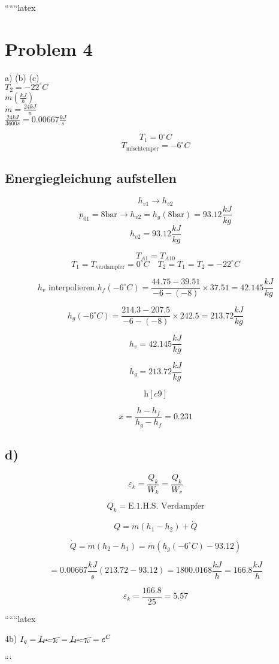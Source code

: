 
``````latex


\section*{Problem 4}

a) (b) (c) \\
$T_2 = -22^\circ C$ \\
$\dot{m} \left( \frac{kJ}{h} \right)$ \\
$\dot{m} = \frac{24 kJ}{n}$ \\
$\frac{24 kJ}{3600 s} = 0.00667 \frac{kJ}{s}$

\[
T_1 = 0^\circ C
\]
\[
T_{\text{mischtemper}} = -6^\circ C
\]

\subsection*{Energiegleichung aufstellen}

\[
h_{v1} \rightarrow h_{v2}
\]
\[
p_{01} = 8 \text{bar} \rightarrow h_{v2} = h_{g} (8 \text{bar}) = 93.12 \frac{kJ}{kg}
\]
\[
h_{v2} = 93.12 \frac{kJ}{kg}
\]

\[
T_{A1} = T_{A10}
\]
\[
T_{1} = T_{\text{verdampfer}} = 0^\circ C \quad T_{2} = T_{1} = T_{2} = -22^\circ C
\]

\[
h_{v} \text{ interpolieren } h_{f} (-6^\circ C) = \frac{44.75 - 39.51}{-6 - (-8)} \times 37.51 = 42.145 \frac{kJ}{kg}
\]

\[
h_{g} (-6^\circ C) = \frac{214.3 - 207.5}{-6 - (-8)} \times 242.5 = 213.72 \frac{kJ}{kg}
\]

\[
h_{v} = 42.145 \frac{kJ}{kg}
\]

\[
h_{g} = 213.72 \frac{kJ}{kg}
\]

\[
\text{h} \left[ c9 \right]
\]

\[
x = \frac{h - h_f}{h_g - h_f} = 0.231
\]

\subsection*{d)}

\[
\varepsilon_k = \frac{Q_k}{W_k} = \frac{Q_k}{W_v}
\]

\[
Q_k = \text{E.1.H.S. Verdampfer}
\]

\[
Q = \dot{m} (h_1 - h_2) + \dot{Q}
\]

\[
\dot{Q} = \dot{m} (h_2 - h_1) = \dot{m} (h_g (-6^\circ C) - 93.12)
\]

\[
= 0.00667 \frac{kJ}{s} (213.72 - 93.12) = 1800.0168 \frac{kJ}{h} = 166.8 \frac{kJ}{h}
\]

\[
\varepsilon_k = \frac{166.8}{25} = \underline{5.57}
\]

``````latex


4b) \( I_q = \cancel{I_{P-K}} = \cancel{I_{P-K}} = e^C \)

```